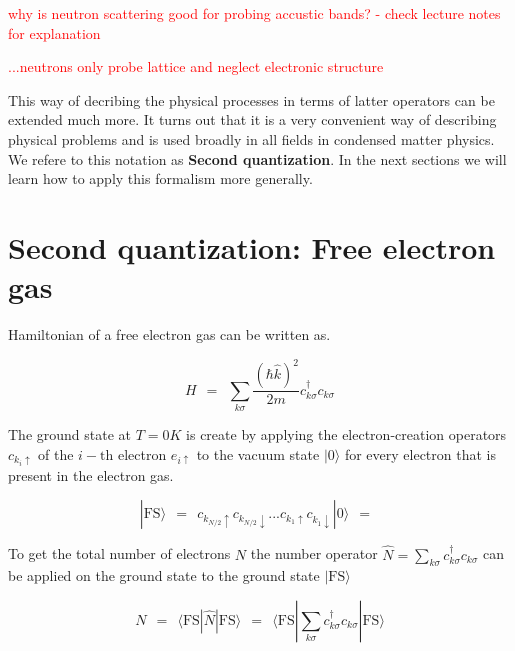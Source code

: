 \documentclass[10pt]{report}
\numberwithin{equation}{chapter}
\begin{document}
\textcolor{red}{why is neutron scattering good for probing accustic bands? - check lecture notes for explanation}

\textcolor{red}{...neutrons only probe lattice and neglect electronic structure}


This way of decribing the physical processes in terms of latter operators can be extended much more. It turns out that it is a very convenient way of describing physical problems and is used broadly in all fields in condensed matter physics. We refere to this notation as \textbf{Second quantization}. In the next sections we will learn how to apply this formalism more generally. 



%

\section{Second quantization: Free electron gas} %

Hamiltonian of a free electron gas can be written as. 

\begin{equation}
  H ~~=~~ \sum_{k \sigma} \frac{(\hbar \hat{k})^2}{2m} c_{k \sigma}^\dag c_{k \sigma}
\end{equation}


The ground state at $T=0K$ is create by applying the electron-creation operators $c_{k_i \uparrow}$ of the $i-\text{th}$ electron $e_{i \uparrow}$ to the vacuum state $|0\rangle$ for every electron that is present in the electron gas. 

\begin{equation}
  | \text{FS} \rangle ~~=~~ c_{k_{N/2} \uparrow} c_{k_{N/2} \downarrow} ... c_{k_1 \uparrow} c_{k_1 \downarrow} | 0 \rangle ~~=~~   
\end{equation}

To get the total number of electrons $N$ the number operator $\hat{N} = \sum_{k \sigma} c_{k\sigma}^\dag c_{k\sigma}$ can be applied on the ground state to the ground state $| \text{FS} \rangle$

\begin{equation}\label{eq:number_operator}
  N ~~=~~ \langle \text{FS} | \hat{N} | \text{FS} \rangle 
    ~~=~~ \langle \text{FS} | \sum_{k\sigma} c_{k\sigma}^\dag c_{k\sigma} | \text{FS} \rangle
\end{equation} 
\end{document}
